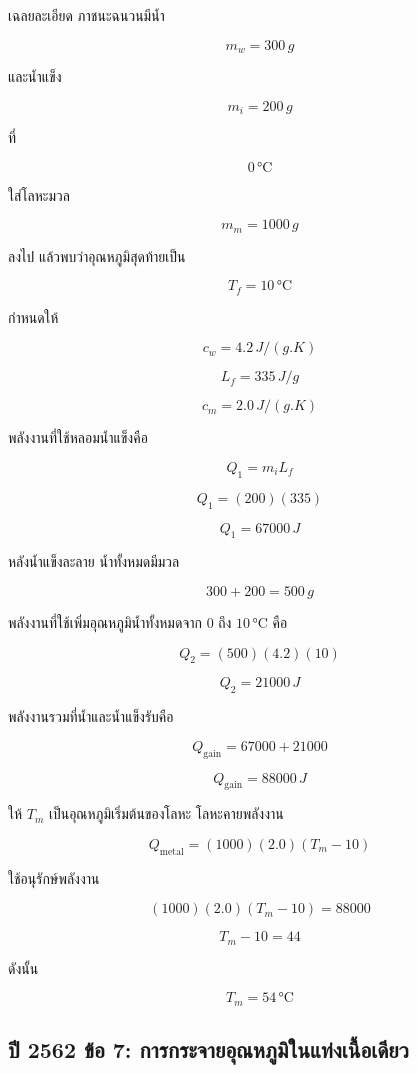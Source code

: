 \begin{examplebox}{เฉลยละเอียด}
ภาชนะฉนวนมีน้ำ

\[
m_w=300\,\si{g}
\]

และน้ำแข็ง

\[
m_i=200\,\si{g}
\]

ที่

\[
0\,\si{\degreeCelsius}
\]

ใส่โลหะมวล

\[
m_m=1000\,\si{g}
\]

ลงไป แล้วพบว่าอุณหภูมิสุดท้ายเป็น

\[
T_f=10\,\si{\degreeCelsius}
\]

กำหนดให้

\[
c_w=4.2\,\si{J/(g.K)}
\]

\[
L_f=335\,\si{J/g}
\]

\[
c_m=2.0\,\si{J/(g.K)}
\]

พลังงานที่ใช้หลอมน้ำแข็งคือ

\[
Q_1=m_iL_f
\]

\[
Q_1=(200)(335)
\]

\[
Q_1=67000\,\si{J}
\]

หลังน้ำแข็งละลาย น้ำทั้งหมดมีมวล

\[
300+200=500\,\si{g}
\]

พลังงานที่ใช้เพิ่มอุณหภูมิน้ำทั้งหมดจาก $0$ ถึง $10\,\si{\degreeCelsius}$ คือ

\[
Q_2=(500)(4.2)(10)
\]

\[
Q_2=21000\,\si{J}
\]

พลังงานรวมที่น้ำและน้ำแข็งรับคือ

\[
Q_{\text{gain}}=67000+21000
\]

\[
Q_{\text{gain}}=88000\,\si{J}
\]

ให้ $T_m$ เป็นอุณหภูมิเริ่มต้นของโลหะ โลหะคายพลังงาน

\[
Q_{\text{metal}}
=
(1000)(2.0)(T_m-10)
\]

ใช้อนุรักษ์พลังงาน

\[
(1000)(2.0)(T_m-10)=88000
\]

\[
T_m-10=44
\]

ดังนั้น

\[
\boxed{
T_m=54\,\si{\degreeCelsius}
}
\]
\end{examplebox}

\subsection{ปี 2562 ข้อ 7: การกระจายอุณหภูมิในแท่งเนื้อเดียว}

